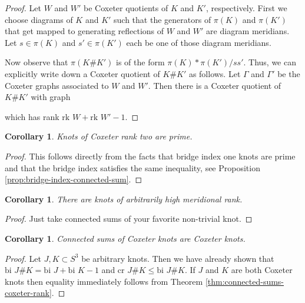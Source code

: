 \documentclass{article}
\newtheorem{corollary}[theorem]{Corollary}
\theoremstyle{definition}
\begin{document}
\begin{proof}
Let $W$ and $W'$ be Coxeter quotients of $K$ and $K'$, respectively. First we choose diagrams of $K$ and $K'$ such that the generators of $\pi(K)$ and $\pi(K')$ that get mapped to generating reflections of $W$ and $W'$ are diagram meridians. Let $s \in \pi(K)$ and $s' \in \pi(K')$ each be one of those diagram meridians.

Now observe that $\pi(K\#K')$ is of the form $\pi(K) * \pi(K') / ss'$. Thus, we can explicitly write down a Coxeter quotient of $K\#K'$ as follows. Let $\Gamma$ and $\Gamma'$ be the Coxeter graphs associated to $W$ and $W'$. Then there is a Coxeter quotient of $K\#K'$ with graph
\begin{center}
\end{center}
which has rank $\text{rk } W + \text{rk } W' - 1$. 
\end{proof}

\begin{corollary}
Knots of Coxeter rank two are prime.
\end{corollary}

\begin{proof}
This follows directly from the facts that bridge index one knots are prime and that the bridge index satisfies the same inequality, see Proposition \ref{prop:bridge-index-connected-sum}.
\end{proof}

\begin{corollary}
There are knots of arbitrarily high meridional rank.
\end{corollary}

\begin{proof}
Just take connected sums of your favorite non-trivial knot.
\end{proof}

\begin{corollary}
Connected sums of Coxeter knots are Coxeter knots.
\end{corollary}

\begin{proof}
Let $J, K \subset S^3$ be arbitrary knots. Then we have already shown that $\text{bi } J\#K = \text{bi } J + \text{bi } K - 1$ and $\text{cr } J\#K \leq \text{bi } J\#K$. If $J$ and $K$ are both Coxeter knots then equality immediately follows from Theorem \ref{thm:connected-sums-coxeter-rank}.
\end{proof}
\end{document}
